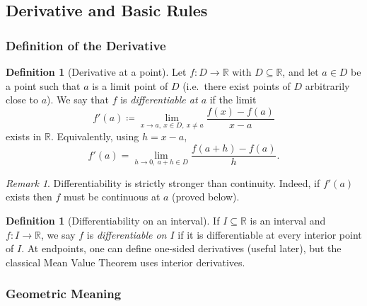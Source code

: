 \documentclass[12pt]{article}
\numberwithin{equation}{section}
\newcommand{\RR}{\mathbb{R}}
\theoremstyle{plain}
\theoremstyle{definition}
\newtheorem{definition}[theorem]{Definition}
\theoremstyle{remark}
\newtheorem{remark}[theorem]{Remark}
\begin{document}
\subsection{Derivative and Basic Rules}

\subsubsection{Definition of the Derivative}

\begin{definition}[Derivative at a point]\label{def:derivative}
Let $f:D\to\RR$ with $D\subseteq\RR$, and let $a\in D$ be a point such that $a$ is a limit point of $D$
(i.e.\ there exist points of $D$ arbitrarily close to $a$).
We say that $f$ is \emph{differentiable at $a$} if the limit
\[
f'(a)\coloneqq \lim_{x\to a,\ x\in D,\ x\neq a}\frac{f(x)-f(a)}{x-a}
\]
exists in $\RR$. Equivalently, using $h=x-a$,
\[
f'(a)=\lim_{h\to 0,\ a+h\in D}\frac{f(a+h)-f(a)}{h}.
\]
\end{definition}

\begin{remark}
Differentiability is strictly stronger than continuity.
Indeed, if $f'(a)$ exists then $f$ must be continuous at $a$ (proved below).
\end{remark}

\begin{definition}[Differentiability on an interval]
If $I\subseteq\RR$ is an interval and $f:I\to\RR$, we say $f$ is \emph{differentiable on $I$}
if it is differentiable at every interior point of $I$.
At endpoints, one can define one-sided derivatives (useful later), but the classical Mean Value Theorem uses interior derivatives.
\end{definition}

\subsubsection{Geometric Meaning}
\end{document}
